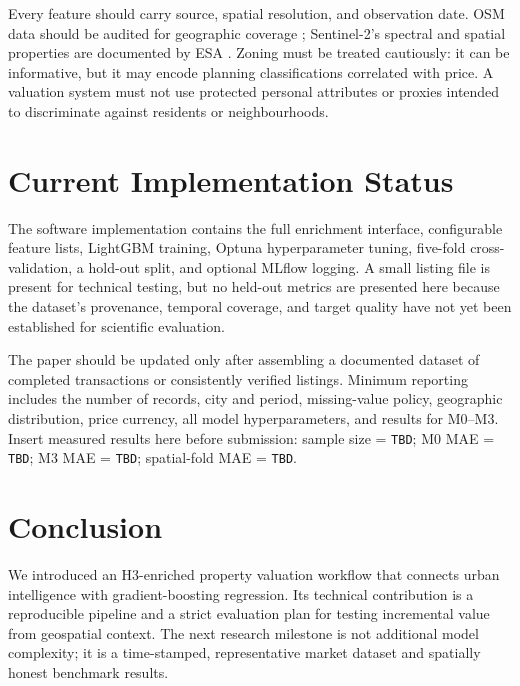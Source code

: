 \documentclass[conference]{IEEEtran}
\begin{document}
Every feature should carry source, spatial resolution, and observation date. OSM data should be audited for geographic coverage \cite{haklay2010osm}; Sentinel-2's spectral and spatial properties are documented by ESA \cite{esaS2}. Zoning must be treated cautiously: it can be informative, but it may encode planning classifications correlated with price. A valuation system must not use protected personal attributes or proxies intended to discriminate against residents or neighbourhoods.

\section{Current Implementation Status}
The software implementation contains the full enrichment interface, configurable feature lists, LightGBM training, Optuna hyperparameter tuning, five-fold cross-validation, a hold-out split, and optional MLflow logging. A small listing file is present for technical testing, but no held-out metrics are presented here because the dataset's provenance, temporal coverage, and target quality have not yet been established for scientific evaluation.

The paper should be updated only after assembling a documented dataset of completed transactions or consistently verified listings. Minimum reporting includes the number of records, city and period, missing-value policy, geographic distribution, price currency, all model hyperparameters, and results for M0--M3. Insert measured results here before submission: sample size = \texttt{TBD}; M0 MAE = \texttt{TBD}; M3 MAE = \texttt{TBD}; spatial-fold MAE = \texttt{TBD}.

\section{Conclusion}
We introduced an H3-enriched property valuation workflow that connects urban intelligence with gradient-boosting regression. Its technical contribution is a reproducible pipeline and a strict evaluation plan for testing incremental value from geospatial context. The next research milestone is not additional model complexity; it is a time-stamped, representative market dataset and spatially honest benchmark results.



\end{document}
